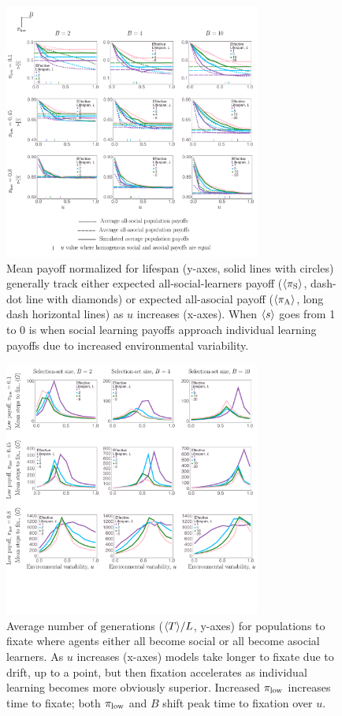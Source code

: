\documentclass[letterpaper,11.5pt]{scrartcl}
\begin{document}
\begin{figure}
  \caption{Mean payoff normalized for lifespan (y-axes, solid lines with circles)
    generally track either expected all-social-learners payoff ($\langle \pi_\mathrm{S} \rangle$, dash-dot
    line with diamonds) or expected all-asocial payoff ($\langle \pi_\mathrm{A} \rangle$, long dash
    horizontal lines) as $u$ increases (x-axes). When $\langle s \rangle$ goes from 1 to
  0 is when social learning payoffs approach individual learning payoffs due to
increased environmental variability.} 
  \label{fig:netPayoffs}
\centering
    \includegraphics[width=0.75\textwidth]{Figures/meanNetPayoffs.pdf}
\end{figure}


\begin{figure}
  \caption{Average number of generations ($\langle T \rangle/L$, y-axes) for populations to fixate
  where agents either all become social or all become asocial learners. As
  $u$ increases (x-axes) models take longer to fixate due to drift, up to a point,
but then fixation accelerates as individual learning becomes more obviously 
superior. Increased $\pi_{\mathrm{low}}$ increases time to fixate; both $\pi_{\mathrm{low}}$ and $B$
shift peak time to fixation over $u$.} 
  \label{fig:steps}
\centering
    \includegraphics[width=0.75\textwidth]{Figures/stepResultsPlots.pdf}
\end{figure}
\end{document}
